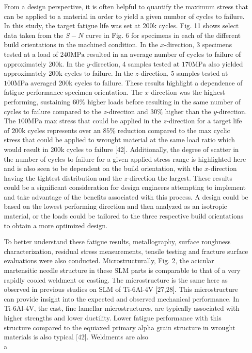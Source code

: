 \documentclass[10pt]{article}
\begin{document}
From a design perspective, it is often helpful to quantify the maximum stress that can be applied to a material in order to yield a given number of cycles to failure. In this study, the target fatigue life was set at 200k cycles. Fig. 11 shows select data taken from the $S-N$ curve in Fig. 6 for specimens in each of the different build orientations in the machined condition. In the $x$-direction, 3 specimens tested at a load of $240 \mathrm{MPa}$ resulted in an average number of cycles to failure of approximately 200k. In the $y$-direction, 4 samples tested at $170 \mathrm{MPa}$ also yielded approximately 200k cycles to failure. In the $z$-direction, 5 samples tested at $100 \mathrm{MPa}$ averaged 200k cycles to failure. These results highlight a dependence of fatigue performance specimen orientation. The $x$-direction was the highest performing, sustaining $60 \%$ higher loads before resulting in the same number of cycles to failure compared to the $z$-direction and $30 \%$ higher than the $y$-direction. The $100 \mathrm{MPa}$ max stress that could be applied in the $z$-direction for a target life of $200 \mathrm{k}$ cycles represents over an $85 \%$ reduction compared to the max cyclic stress that could be applied to wrought material at the same load ratio which would result in 200k cycles to failure [42]. Additionally, the degree of scatter in the number of cycles to failure for a given applied stress range is highlighted here and is also seen to be dependent on the build orientation, with the $x$-direction having the tightest distribution and the $z$-direction the largest. These results could be a significant consideration for design engineers attempting to implement and take advantage of the benefits associated with this process. A design could be based on the lowest performing direction and then analyzed as an isotropic material, or the loads could be tailored to the three respective build orientations to obtain a more optimized design.

To better understand these fatigue results, metallography, surface roughness characterization, residual stress measurements, tensile testing and fracture surface evaluations were also conducted. Microstructurally, Fig. 2, the acicular martensitic needle structure in these SLM parts is comparable to that of a very rapidly cooled weldment or casting. The microstructure is the same here as observed in previous studies on SLM of Ti-6Al-4V [27,28]. This microstructure can provide insight into the expected and observed mechanical performance. In Ti-6Al-4V, the cast, fine lamellar microstructures, are typically associated with higher strengths and lower ductility. Lower fatigue performance with this structure compared to the equiaxed primary alpha grain structure in wrought materials is also typical [42]. Weldments are also\\
a
\end{document}
